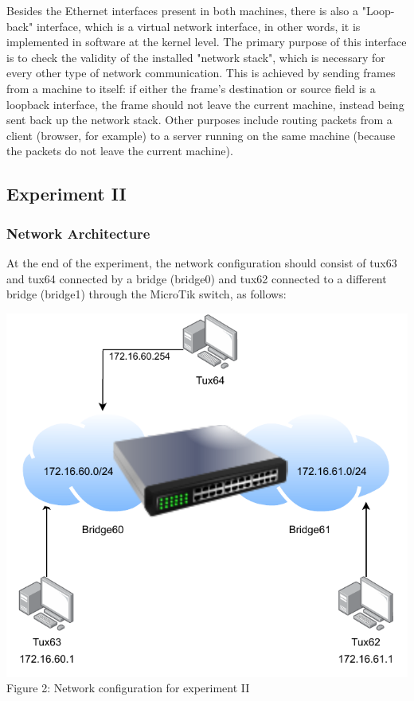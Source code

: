 \documentclass[11pt,a4paper,twocolumn]{article}
\begin{document}
Besides the Ethernet interfaces present in both machines, there is also a "Loop-back" interface, which is a virtual network interface, in other words, it is implemented in software at the kernel level.
The primary purpose of this interface is to check the validity of the installed "network stack", which is necessary for every other type of network communication.
This is achieved by sending frames from a machine to itself: if either the frame's destination or source field is a loopback interface, the frame should not leave the current machine, instead being sent back up the network stack.
Other purposes include routing packets from a client (browser, for example) to a server running on the same machine (because the packets do not leave the current machine).

\subsection{Experiment II}

\subsubsection{Network Architecture}

At the end of the experiment, the network configuration should consist of tux63 and tux64 connected by a bridge (bridge0) and tux62 connected to a different bridge (bridge1) through the MicroTik switch, as follows:

\includegraphics{experiment2}
Figure 2: Network configuration for experiment II
\end{document}
